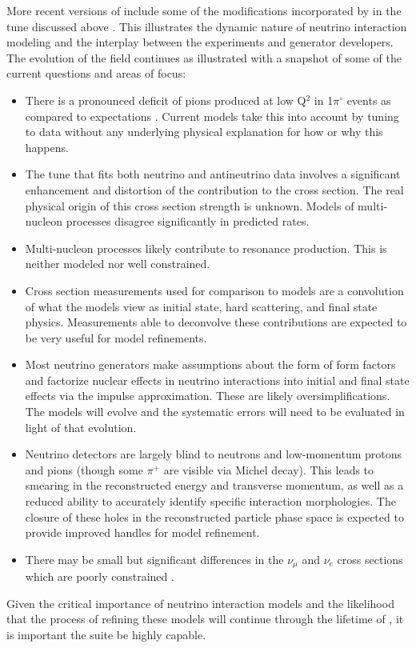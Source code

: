 More recent versions of  include some of the modifications incorporated by  in the tune discussed above \cite{Alam:2015nkk}.  This illustrates the dynamic nature of neutrino interaction modeling and the interplay between the experiments and generator developers.  The evolution of the field continues as illustrated with a snapshot of some of the current questions and areas of focus:
\begin{itemize}
    \item There is a pronounced deficit of pions produced at low Q$^{2}$ in 1$\pi^{\circ}$ events as compared to expectations \cite{BercellieNUINT2018,Altinok:2017xua,Aliaga:2015wva,McGivern:2016bwh,novaminosPC}.  Current models take this into account by tuning to data without any underlying physical explanation for how or why this happens.
    \item The  tune that fits both neutrino and antineutrino  data involves a significant enhancement and distortion of the  contribution to the cross section.  The real physical origin of this cross section strength is unknown.  Models of multi-nucleon processes disagree significantly in predicted rates.
    \item Multi-nucleon processes likely contribute to resonance production.  This is neither modeled nor well constrained.
    \item Cross section measurements used for comparison to models are a convolution of what the models view as initial state, hard scattering, and final state physics.   Measurements able to deconvolve these contributions are expected to be very useful for model refinements.  
    \item Most neutrino generators make assumptions about the form of form factors and factorize nuclear effects in neutrino interactions into initial and final state effects via the impulse approximation.  These are likely oversimplifications.  The models will evolve and the systematic errors will need to be evaluated in light of that evolution. 
    \item  Neutrino detectors are largely blind to neutrons and low-momentum protons and pions (though some $\pi^{+}$ are visible via Michel decay).  This leads to smearing in the  reconstructed energy and transverse momentum, as well as a reduced ability to accurately identify specific interaction morphologies.  The closure of these holes in the reconstructed particle phase space is expected to provide improved handles for model refinement.
    \item There may be small but significant differences in the $\nu_{\mu}$ and $\nu_{e}$  cross sections which are poorly constrained \cite{Day-McFarland:2012}.
\end{itemize}
Given the critical importance of neutrino interaction models and the likelihood that the process of refining these models will continue through the lifetime of , it is important the    suite be highly capable.   

